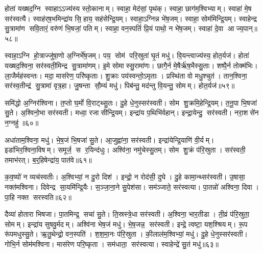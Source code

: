 होता॑ यख्षद॒ग्नि स्वाहाऽऽज्य॑स्य स्तो॒कानाम्। स्वाहा॒ मेद॑सां॒ पृथ॑क्। स्वाहा॒ छाग॑म॒श्विभ्याम्। स्वाहा॑ मे॒ष सर॑स्वत्यै। स्वाह॑र्‌ष॒भमिन्द्रा॑य सि॒हाय॒ सह॑सेन्द्रि॒यम्। स्वाहा॒ऽग्निन्न भे॑ष॒जम्। स्वाहा॒ सोम॑मिन्द्रि॒यम्। स्वाहेन्द्र सु॒त्रामा॑ण सवि॒तारं॒ वरु॑णं भि॒षजां॒ पतिम्। स्वाहा॒ वन॒स्पतिं॑ प्रि॒यं पाथो॒ न भे॑ष॒जम्। स्वाहा॑ दे॒वा आज्य॒पान्॥५८॥

स्वाहा॒ऽग्नि हो॒त्राज्जु॑षा॒णो अ॒ग्निर्भे॑ष॒जम्। पय॒ सोम॑ परि॒स्रुता॑ घृ॒तं मधु॑। वि॒यन्त्वाज्य॑स्य॒ होत॒र्यज॑। होता॑ यख्षद॒श्विना॒ सर॑स्वती॒मिन्द्र सु॒त्रामा॑णम्। इ॒मे सोमास्सु॒रामा॑णः। छागै॒र्न मे॒षैर्\mbox{}ऋ॑ष॒भैस्सु॒ताः। शष्पै॒र्न तोक्म॑भिः। ला॒जैर्मह॑स्वन्तः। मदा॒ मास॑रेण॒ परि॑ष्कृताः। शु॒क्राः पय॑स्वन्तो॒ऽमृताः। प्रस्थि॑ता वो मधु॒श्चुत॑। तान॒श्विना॒ सर॑स्व॒तीन्द्र॑ सु॒त्रामा॑ वृत्र॒हा। जु॒षन्ता सौ॒म्यं मधु॑। पिब॑न्तु॒ मद॑न्तु वि॒यन्तु॒ सोमम्। होत॒र्यज॑॥५९॥\anuvakamend[वी॒र्य॑व्विँ॒यन्त्वाज्य॑स्य॒ होत॒र्यज॒ नास॑त्या॒ सर॑स्वती॒ मधु॑ हिर॒ण्ययं॑ भेष॒जव्विँ॒यन्त्वाज्य॑स्य॒ होत॒र्यजाज्य॒पान॒मृता॒ पञ्च॑ च (स॒मिधा॒ऽग्नि षट्। तनू॒नपाथ्स॒प्त। नरा॒शस॒मृषि॑। इ॒डेडि॒तो यवै॑र॒ष्टौ। ब॒र्‌हि॒ स॒प्त। दुरो॒ऽश्विना॒ नव॑। सु॒पेश॒सर्‌षि॑। दैव्या॒ होता॑रा॒ सीसे॑न॒ रस॑। ति॒स्रस्त्वष्टा॑रम॒ष्टाव॑ष्टौ। वन॒स्पति॒मृषि॑। अ॒ग्निन्त्रयो॑दश। अ॒श्विना॒ द्वाद॑श त्रयोदश। स॒मिधा॒ऽग्निं बद॑रै॒र्बद॑रै॒र्यवै॑र॒श्विना॒ त्विषि॑म॒श्विना॒ न भे॑ष॒ज रू॒पम॒श्विना॑ भी॒मं भामम् ॥ )]

समि॑द्धो अ॒ग्निर॑श्विना। त॒प्तो घ॒र्मो वि॒राट्थ्सु॒तः। दु॒हे धे॒नुस्सर॑स्वती। सोम शु॒क्रमि॒हेन्द्रि॒यम्। त॒नू॒पा भि॒षजा॑ सु॒ते। अ॒श्विनो॒भा सर॑स्वती। मध्वा॒ रजासीन्द्रि॒यम्। इन्द्रा॑य प॒थिभि॑र्वहान्। इन्द्रा॒येन्दु॒ सर॑स्वती। नरा॒शसे॑न न॒ग्नहु॑॥६०॥

अधा॑ताम॒श्विना॒ मधु॑। भे॒ष॒जं भि॒षजा॑ सु॒ते। आ॒जुह्वा॑ना॒ सर॑स्वती। इन्द्रा॑येन्द्रि॒याणि॑ वी॒र्यम्। इडा॑भिर॒श्विना॒विषम्। समूर्ज॒ स र॒यिन्द॑धुः। अश्वि॑ना॒ नमु॑चेस्सु॒तम्। सोम शु॒क्रं प॑रि॒स्रुता। सर॑स्वती॒ तमाभ॑रत्। ब॒र्॒हिषेन्द्रा॑य॒ पात॑वे॥६१॥

क॒व॒ष्यो॑ न व्यच॑स्वतीः। अ॒श्विभ्यां॒ न दु॒रो दिश॑। इन्द्रो॒ न रोद॑सी॒ दुघे। दु॒हे कामा॒न्थ्सर॑स्वती। उ॒षासा॒ नक्त॑मश्विना। दिवेन्द्र सा॒यमि॑न्द्रि॒यैः। स॒ञ्जा॒ना॒ने सु॒पेश॑सा। सम॑ञ्जाते॒ सर॑स्वत्या। पा॒तन्नो॑ अश्विना॒ दिवा। पा॒हि नक्त सरस्वति॥६२॥

दैव्या॑ होतारा भिषजा। पा॒तमिन्द्र॒ सचा॑ सु॒ते। ति॒स्रस्त्रे॒धा सर॑स्वती। अ॒श्विना॒ भार॒तीडा। ती॒व्रं प॑रि॒स्रुता॒ सोमम्। इन्द्रा॑य सुषवु॒र्मदम्। अश्वि॑ना भेष॒जं मधु॑। भे॒ष॒जन्न॒ सर॑स्वती। इन्द्रे॒ त्वष्टा॒ यश॒श्श्रियम्। रू॒प रू॑पमधुस्सु॒ते। ऋ॒तु॒थेन्द्रो॒ वन॒स्पति॑। श॒श॒मा॒नः प॑रि॒स्रुता। की॒लाल॑म॒श्विभ्यां॒ मधु॑। दु॒हे धे॒नुस्सर॑स्वती। गोभि॒र्न सोम॑मश्विना। मास॑रेण परि॒ष्कृता। सम॑धाता॒ सर॑स्वत्या। स्वाहेन्द्रे॑ सु॒तं मधु॑॥६३॥\anuvakamend[न॒ग्नहु॒ पात॑वे सरस्वत्यधुस्सु॒तेऽष्टौ च॑]

